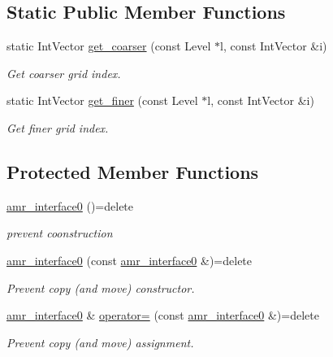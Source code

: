 \subsection*{Static Public Member Functions}
\begin{DoxyCompactItemize}
\item 
static Int\+Vector \hyperlink{classUintah_1_1PhaseField_1_1detail_1_1amr__interface0_3_01NC_01_4_a48d0bbcf71aa7b965cfb026b6b7c9d05}{get\+\_\+coarser} (const Level $\ast$l, const Int\+Vector \&i)
\begin{DoxyCompactList}\small\item\em Get coarser grid index. \end{DoxyCompactList}\item 
static Int\+Vector \hyperlink{classUintah_1_1PhaseField_1_1detail_1_1amr__interface0_3_01NC_01_4_a474c01b32edcf2ba2dac72c35a63edba}{get\+\_\+finer} (const Level $\ast$l, const Int\+Vector \&i)
\begin{DoxyCompactList}\small\item\em Get finer grid index. \end{DoxyCompactList}\end{DoxyCompactItemize}
\subsection*{Protected Member Functions}
\begin{DoxyCompactItemize}
\item 
\hyperlink{classUintah_1_1PhaseField_1_1detail_1_1amr__interface0_3_01NC_01_4_a16d98f7ce2ef79663793cd2235c857bc}{amr\+\_\+interface0} ()=delete
\begin{DoxyCompactList}\small\item\em prevent coonstruction \end{DoxyCompactList}\item 
\hyperlink{classUintah_1_1PhaseField_1_1detail_1_1amr__interface0_3_01NC_01_4_ad771896bd47c8e03eac2e63330ae52ec}{amr\+\_\+interface0} (const \hyperlink{classUintah_1_1PhaseField_1_1detail_1_1amr__interface0}{amr\+\_\+interface0} \&)=delete
\begin{DoxyCompactList}\small\item\em Prevent copy (and move) constructor. \end{DoxyCompactList}\item 
\hyperlink{classUintah_1_1PhaseField_1_1detail_1_1amr__interface0}{amr\+\_\+interface0} \& \hyperlink{classUintah_1_1PhaseField_1_1detail_1_1amr__interface0_3_01NC_01_4_a9aaf0ac9821706c4d1b07b879c9f2937}{operator=} (const \hyperlink{classUintah_1_1PhaseField_1_1detail_1_1amr__interface0}{amr\+\_\+interface0} \&)=delete
\begin{DoxyCompactList}\small\item\em Prevent copy (and move) assignment. \end{DoxyCompactList}\end{DoxyCompactItemize}


